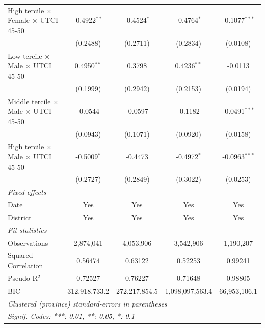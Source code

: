 \begin{table}[htbp]
\begin{tabular}{lcccc}
      High tercile $\times$ Female $\times$ UTCI 45-50     & -0.4922$^{**}$  & -0.4524$^{*}$       & -0.4764$^{*}$     & -0.1077$^{***}$\\   
                                                           & (0.2488)        & (0.2711)            & (0.2834)          & (0.0108)\\   
      Low tercile $\times$ Male $\times$ UTCI 45-50        & 0.4950$^{**}$   & 0.3798              & 0.4236$^{**}$     & -0.0113\\   
                                                           & (0.1999)        & (0.2942)            & (0.2153)          & (0.0194)\\   
      Middle tercile $\times$ Male $\times$ UTCI 45-50     & -0.0544         & -0.0597             & -0.1182           & -0.0491$^{***}$\\   
                                                           & (0.0943)        & (0.1071)            & (0.0920)          & (0.0158)\\   
      High tercile $\times$ Male $\times$ UTCI 45-50       & -0.5009$^{*}$   & -0.4473             & -0.4972$^{*}$     & -0.0963$^{***}$\\   
                                                           & (0.2727)        & (0.2849)            & (0.3022)          & (0.0253)\\   
      \midrule
      \emph{Fixed-effects}\\
      Date                                                 & Yes             & Yes                 & Yes               & Yes\\  
      District                                             & Yes             & Yes                 & Yes               & Yes\\  
      \midrule
      \emph{Fit statistics}\\
      Observations                                         & 2,874,041       & 4,053,906           & 3,542,906         & 1,190,207\\  
      Squared Correlation                                  & 0.56474         & 0.63122             & 0.52253           & 0.99241\\  
      Pseudo R$^2$                                         & 0.72527         & 0.76227             & 0.71648           & 0.98805\\  
      BIC                                                  & 312,918,733.2   & 272,217,854.5       & 1,098,097,563.4   & 66,953,106.1\\  
      \midrule \midrule
      \multicolumn{5}{l}{\emph{Clustered (province) standard-errors in parentheses}}\\
      \multicolumn{5}{l}{\emph{Signif. Codes: ***: 0.01, **: 0.05, *: 0.1}}\\
   \end{tabular}
\end{table}


